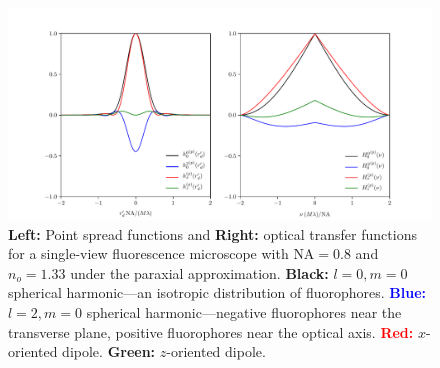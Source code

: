 \documentclass[11pt]{article}
\begin{document}
\begin{figure}[h]
 \captionsetup{width=1.0\linewidth}
 \centering
   \centering
   \includegraphics[width = 1.\textwidth]{../calculations/compare-ft/psfs.pdf}
   \caption{\textbf{Left:} Point spread functions and \textbf{Right:} optical
     transfer functions for a single-view fluorescence microscope with
     $\text{NA}=0.8$ and $n_o=1.33$ under the paraxial approximation.
     \textbf{Black:} $l=0, m=0$ spherical harmonic---an isotropic distribution
     of fluorophores. \textcolor{blue}{\textbf{Blue:}} $l=2, m=0$ spherical
     harmonic---negative fluorophores near the transverse plane, positive
     fluorophores near the optical axis. \textcolor{red}{\textbf{Red:}}
     $x$-oriented dipole. \textcolor{OliveGreen}{\textbf{Green:}} $z$-oriented
     dipole.}
   \label{fig:para}
\end{figure}
    
{}


\appendix
\end{document}
